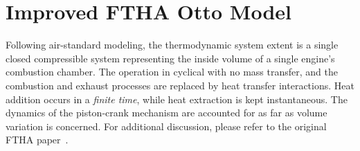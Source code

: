 \section{Improved FTHA Otto Model}

    Following air-standard modeling, the thermodynamic system extent is a single closed  compressible  system  representing  the
    inside volume of a single engine's combustion chamber. The operation in cyclical with no mass transfer, and  the  combustion
    and exhaust processes are replaced by heat transfer interactions. Heat addition occurs in a \emph{finite time},  while  heat
    extraction is kept instantaneous. The dynamics of the piston-crank mechanism are accounted for as far as volume variation is
    concerned. For additional discussion, please refer to the original FTHA paper~\cite{2017-NaaktgeborenC-IntJMechEngEduc}.


